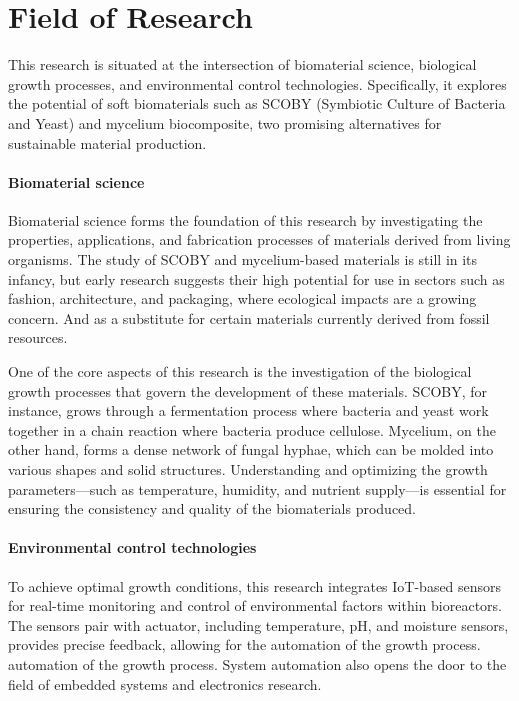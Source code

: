 \section{Field of Research}

This research is situated at the intersection of biomaterial science, biological growth processes, and environmental control technologies. Specifically, 
it explores the potential of soft biomaterials such as SCOBY (Symbiotic Culture of Bacteria and Yeast) and mycelium biocomposite, two promising alternatives 
for sustainable material production. 

\paragraph[short]{Biomaterial science} 
Biomaterial science forms the foundation of this research by investigating the properties, applications, and fabrication processes of materials derived from living organisms. 
The study of SCOBY and mycelium-based materials is still in its infancy, but early research suggests their high potential for use in sectors such as fashion\cite{amobonye2023fungal}, architecture\cite{ghazvinian2019mycelium}, and packaging\cite{abhijith2018sustainable}, where ecological impacts are a growing concern. And as a substitute for certain materials currently derived from fossil resources\cite{jang2017bacterial}.

One of the core aspects of this research is the investigation of the biological growth processes that govern the development of these materials. SCOBY, for instance, grows through a fermentation process where bacteria and yeast work together in a chain reaction where bacteria produce cellulose. Mycelium, on the other hand, forms a dense network of fungal hyphae, which can be molded into various shapes and solid structures. Understanding and optimizing the growth parameters—such as temperature, humidity, and nutrient supply—is essential for ensuring the consistency and quality of the biomaterials produced.

\paragraph[short]{ Environmental
control technologies}
To achieve optimal growth conditions, this research integrates IoT-based sensors for real-time monitoring and control of environmental factors within bioreactors. 
The sensors pair with actuator, including temperature, pH, and moisture sensors, provides precise feedback, allowing for the automation of the growth process. 
automation of the growth process. System automation also opens the door to the field of embedded systems and electronics research. 

